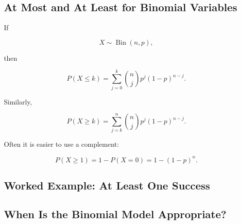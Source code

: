 \subsection{At Most and At Least for Binomial Variables}
\label{subsec:binomial-cumulative-events}

If

\[
X\sim\operatorname{Bin}(n,p),
\]

then

\[
P(X\leq k)
=
\sum_{j=0}^{k}
\binom njp^j(1-p)^{n-j}.
\]

Similarly,

\[
P(X\geq k)
=
\sum_{j=k}^{n}
\binom njp^j(1-p)^{n-j}.
\]

Often it is easier to use a complement:

\[
\boxed{
P(X\geq1)
=
1-P(X=0)
=
1-(1-p)^n.
}
\]

\subsection{Worked Example: At Least One Success}
\label{subsec:worked-binomial-at-least-one}


\subsection{When Is the Binomial Model Appropriate?}
\label{subsec:binomial-conditions}

